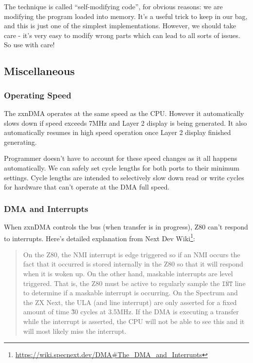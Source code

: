 {The technique is called ``self-modifying code'', for obvious reasons: we are modifying the program loaded into memory. It's a useful trick to keep in our bag, and this is just one of the simplest implementations. However, we should take care - it's very easy to modify wrong parts which can lead to all sorts of issues. So use with care!


\subsection{Miscellaneous}


\subsubsection{Operating Speed}

The zxnDMA operates at the same speed as the CPU. However it automatically slows down if speed exceeds 7MHz and Layer 2 display is being generated. It also automatically resumes in high speed operation once Layer 2 display finished generating.

Programmer doesn't have to account for these speed changes as it all happens automatically. We can safely set cycle lengths for both ports to their minimum settings. Cycle lengths are intended to selectively slow down read or write cycles for hardware that can't operate at the DMA full speed.


\subsubsection{DMA and Interrupts}

When zxnDMA controls the bus (when transfer is in progress), Z80 can't respond to interrupts. Here's detailed explanation from Next Dev Wiki\footnote{\url{https://wiki.specnext.dev/DMA\#The_DMA_and_Interrupts}}:

\vspace*{-1ex}
\begin{quote}
	On the Z80, the NMI interrupt is edge triggered so if an NMI occurs the fact that it occurred is stored internally in the Z80 so that it will respond when it is woken up. On the other hand, maskable interrupts are level triggered. That is, the Z80 must be active to regularly sample the $\mathtt{\overline{INT}}$ line to determine if a maskable interrupt is occurring. On the Spectrum and the ZX Next, the ULA (and line interrupt) are only asserted for a fixed amount of time \~30 cycles at 3.5MHz. If the DMA is executing a transfer while the interrupt is asserted, the CPU will not be able to see this and it will most likely miss the interrupt.
\end{quote}

}
